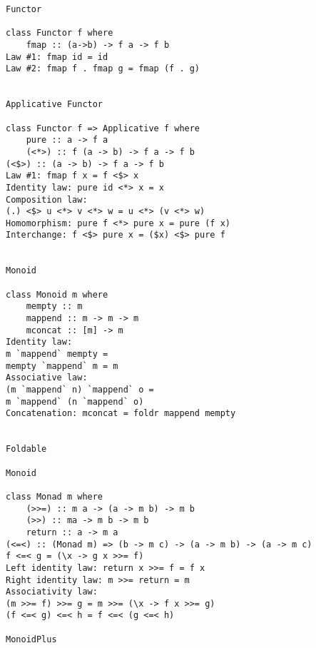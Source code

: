 \documentclass[twocolumn]{article}
\begin{document}
\begin{lstlisting}
Functor

class Functor f where
	fmap :: (a->b) -> f a -> f b
Law #1: fmap id = id
Law #2: fmap f . fmap g = fmap (f . g)


Applicative Functor

class Functor f => Applicative f where
	pure :: a -> f a
	(<*>) :: f (a -> b) -> f a -> f b
(<$>) :: (a -> b) -> f a -> f b
Law #1: fmap f x = f <$> x
Identity law: pure id <*> x = x
Composition law:
(.) <$> u <*> v <*> w = u <*> (v <*> w)
Homomorphism: pure f <*> pure x = pure (f x)
Interchange: f <$> pure x = ($x) <$> pure f


Monoid

class Monoid m where
	mempty :: m
	mappend :: m -> m -> m
	mconcat :: [m] -> m
Identity law:
m `mappend` mempty =
mempty `mappend` m = m
Associative law:
(m `mappend` n) `mappend` o =
m `mappend` (n `mappend` o)
Concatenation: mconcat = foldr mappend mempty


Foldable

Monoid

class Monad m where
	(>>=) :: m a -> (a -> m b) -> m b
	(>>) :: ma -> m b -> m b
	return :: a -> m a
(<=<) :: (Monad m) => (b -> m c) -> (a -> m b) -> (a -> m c)
f <=< g = (\x -> g x >>= f)
Left identity law: return x >>= f = f x
Right identity law: m >>= return = m
Associativity law:
(m >>= f) >>= g = m >>= (\x -> f x >>= g)
(f <=< g) <=< h = f <=< (g <=< h)

MonoidPlus
\end{lstlisting}
\end{document}
